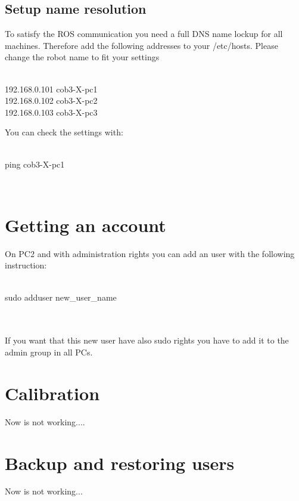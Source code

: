 \subsection{Setup name resolution} 
To satisfy the ROS communication you need a full DNS name lockup for all machines. Therefore add the following addresses to your /etc/hosts. Please change the robot name to fit your settings 
\\
\\ \colorbox{light-gray}{
         \begin{minipage}{1.0\textwidth} 
		192.168.0.101 cob3-X-pc1\\
		192.168.0.102 cob3-X-pc2\\
		192.168.0.103 cob3-X-pc3
         \end{minipage} }

You can check the settings with:
\\
\\   \colorbox{light-gray}{
         \begin{minipage}{1.0\textwidth} 
		ping cob3-X-pc1
         \end{minipage}  } \\


\section{Getting an account}
On PC2 and with administration rights you can add an user with the following instruction:
\\
\\   \colorbox{light-gray}{
         \begin{minipage}{1.0\textwidth} 
		sudo adduser new\_user\_name
         \end{minipage}  } 
	\\
	\\
If you want that this new user have also sudo rights you have to add it to the admin group in all PCs.

\section{Calibration}
Now is not working....
\section{Backup and restoring users}   
Now is not working...    

